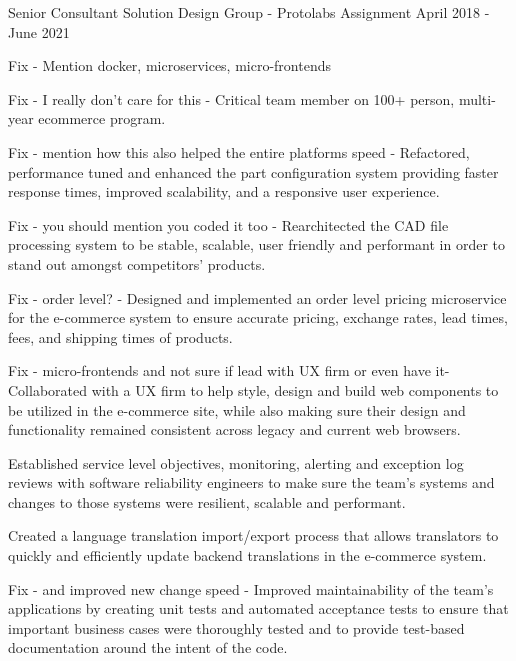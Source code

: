 \begin{cventries}
  \cventry
    {Senior Consultant} %
    {Solution Design Group - Protolabs Assignment} %
    {} %
    {April 2018 - June 2021} %
    {
      \begin{cvitems} %
      	\item {Fix - Mention docker, microservices, micro-frontends}
        \item {Fix - I really don't care for this - Critical team member on 100+ person, multi-year ecommerce program.}
        \item {Fix - mention how this also helped the entire platforms speed - Refactored, performance tuned and enhanced the part configuration system providing faster response times, improved scalability, and a responsive user experience.}
        \item {Fix - you should mention you coded it too - Rearchitected the CAD file processing system to be stable, scalable, user friendly and performant in order to stand out amongst competitors’ products.
        }
        \item {Fix - order level? - Designed and implemented an order level pricing microservice for the e-commerce system to ensure accurate pricing, exchange rates, lead times, fees, and shipping times of products.}
        \item {Fix - micro-frontends and not sure if lead with UX firm or even have it- Collaborated with a UX firm to help style, design and build web components to be utilized in the e-commerce site, while also making sure their design and functionality remained consistent across legacy and current web browsers.}
        \item {Established service level objectives, monitoring, alerting and exception log reviews with software reliability engineers to make sure the team’s systems and changes to those systems were resilient, scalable and performant.}
        \item {Created a language translation import/export process that allows translators to quickly and efficiently update backend translations in the e-commerce system.}
        \item {Fix - and improved new change speed - Improved maintainability of the team’s applications by creating unit tests and automated acceptance tests to ensure that important business cases were thoroughly tested and to provide test-based documentation around the intent of the code.}
      \end{cvitems}
    }
    

\end{cventries}
